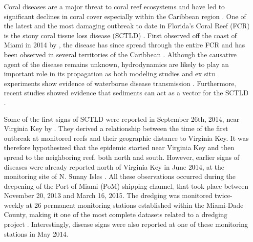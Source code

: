 \documentclass[preprint,12pt,authoryear]{elsarticle}
\begin{document}
Coral diseases are a major threat to coral reef ecosystems and have led to significant declines in coral cover especially within the Caribbean region \citep{richardson1998coral, sutherland2004disease, aronson2001white, harvell2007coral, brandt2009dynamics}. One of the latest and the most damaging outbreak to date in Florida's Coral Reef (FCR) is the stony coral tissue loss disease (SCTLD) \citep{noaa2018}. First observed off the coast of Miami in 2014 by \cite{precht2016unprecedented}, the disease has since spread through the entire FCR \citep{muller2020spatial,dobbelaere2022} and has been observed in several territories of the Caribbean \citep{kramer2019map, meiling2021variable, estrada2021effects,heres2021ecological}. Although the causative agent of the disease remains unknown, hydrodynamics are likely to play an important role in its propagation as both modeling studies and ex situ experiments show evidence of waterborne disease transmission \citep{aeby2019pathogenesis,dobbelaere2020coupled,eaton2021measuring, meiling2021variable}. Furthermore, recent studies showed evidence that sediments can act as  a vector for the SCTLD \citep{rosales2020rhodobacterales, studivan2022reef}.

Some of the first signs of SCTLD were reported in September 26th, 2014, near Virginia Key by \cite{precht2016unprecedented}. They derived a relationship between the time of the first outbreak at monitored reefs and their geographic distance to Virginia Key. It was therefore hypothesized that the epidemic started near Virginia Key and then spread to the neighboring reef, both north and south. However, earlier signs of diseases were already reported north of Virginia Key in June 2014, at the monitoring site of N. Sunny Isles \citep{precht2016unprecedented}. All these observations occurred during the deepening of the Port of Miami (PoM) shipping channel, that took place between November 20, 2013 and March 16, 2015. The dredging was monitored twice-weekly at 26 permanent monitoring stations established within the Miami-Dade County, making it one of the most complete datasets related to a dredging project \citep{gintert2019regional}. Interestingly, disease signs were also reported at one of these monitoring stations in May 2014.
\end{document}
